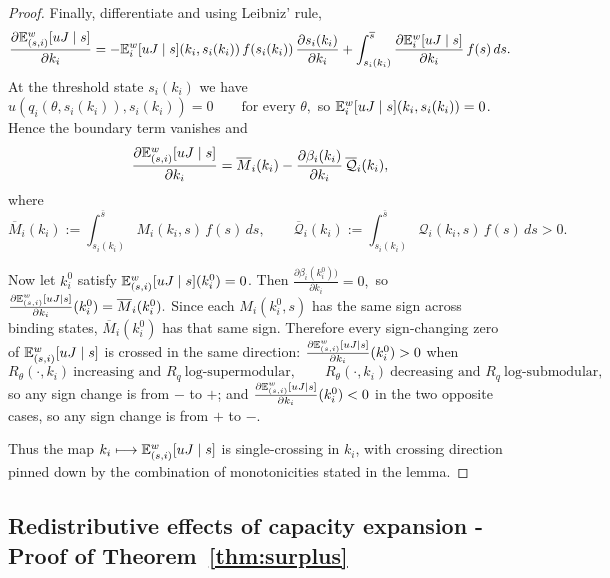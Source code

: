 \documentclass{class}
\begin{document}
\begin{proof}
Finally, differentiate and using Leibniz' rule,
\[
\frac{\partial \mathbb{E}_{(s,i)}^w[uJ\mid s]}{\partial k_i}
=
-
\mathbb{E}_i^w[uJ\mid s]\!\left(k_i,s_i(k_i)\right)
f\!\left(s_i(k_i)\right)
\frac{\partial s_i(k_i)}{\partial k_i}
+
\int_{s_i(k_i)}^{\overline s}
\frac{\partial \mathbb{E}_i^w[uJ\mid s]}{\partial k_i}\,f(s)\,ds.
\]
At the threshold state $s_i(k_i)$ we have
$u\!\left(q_i(\theta,s_i(k_i)),s_i(k_i)\right)=0 \qquad \text{for every }\theta,$
so $\mathbb{E}_i^w[uJ\mid s]\!\left(k_i,s_i(k_i)\right)=0$. Hence the boundary term vanishes and
\[
\frac{\partial \mathbb{E}_{(s,i)}^w[uJ\mid s]}{\partial k_i}
=
\overline M_i(k_i)-\frac{\partial \beta_i(k_i)}{\partial k_i}\,\overline{\mathcal Q}_i(k_i),
\]
where
\[
\overline M_i(k_i)
:=
\int_{s_i(k_i)}^{\overline s}M_i(k_i,s)\,f(s)\,ds,
\qquad
\overline{\mathcal Q}_i(k_i)
:=
\int_{s_i(k_i)}^{\overline s}\mathcal Q_i(k_i,s)\,f(s)\,ds
>0.
\]

Now let $k_i^0$ satisfy $\mathbb{E}_{(s,i)}^w[uJ\mid s](k_i^0)=0$. Then
$\frac{\partial \beta_i(k_i^0))}{\partial k_i}=0,$
so
$\frac{\partial \mathbb{E}_{(s,i)}^w[uJ\mid s]}{\partial k_i}(k_i^0)=\overline M_i(k_i^0).$
Since each $M_i(k_i^0,s)$ has the same sign across binding states, $\overline M_i(k_i^0)$ has that same sign. Therefore every sign-changing zero of $\mathbb{E}_{(s,i)}^w[uJ\mid s]$ is crossed in the same direction:
$\frac{\partial \mathbb{E}_{(s,i)}^w[uJ\mid s]}{\partial k_i}(k_i^0)>0$
when
\[
R_\theta(\cdot,k_i)\ \text{increasing and }R_q\ \text{log-supermodular},
\qquad
R_\theta(\cdot,k_i)\ \text{decreasing and }R_q\ \text{log-submodular},
\]
so any sign change is from $-$ to $+$; and
$\frac{\partial \mathbb{E}_{(s,i)}^w[uJ\mid s]}{\partial k_i}(k_i^0)<0$
in the two opposite cases, so any sign change is from $+$ to $-$.

Thus the map
$k_i\longmapsto \mathbb{E}_{(s,i)}^w[uJ\mid s]$
is single-crossing in $k_i$, with crossing direction pinned down by the combination of monotonicities stated in the lemma.
\end{proof}

\subsection{Redistributive effects of capacity expansion - Proof of Theorem~\ref{thm:surplus}}\label{proof:surplus}
\end{document}
